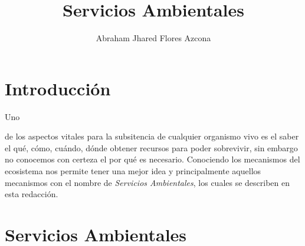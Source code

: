 \documentclass[stu, 12pt, letterpaper, donotrepeattitle, floatsintext, natbib]{apa7}
\title{\Large Servicios Ambientales}
\author{Abraham Jhared Flores Azcona} %
\affiliation{Instituto Tecnológico de Tijuana}
\begin{document}
\maketitle


\renewcommand\contentsname{Contenido}
\tableofcontents
\renewcommand{\listfigurename}{Figuras}
\listoffigures

\newpage
\section*{Introducción}
Uno \begin{justifying}
    de los aspectos vitales para la subsitencia de cualquier organismo vivo es el saber el qué, cómo, cuándo, dónde obtener
    recursos para poder sobrevivir, sin embargo no conocemos con certeza el por qué es necesario. Conociendo los mecanismos del ecosistema
    nos permite tener una mejor idea y principalmente aquellos mecanismos con el nombre de \emph{Servicios Ambientales}, los cuales se describen
    en esta redacción.\par
\end{justifying}
\vspace{\baselineskip}
\section{Servicios Ambientales}
\end{document}
